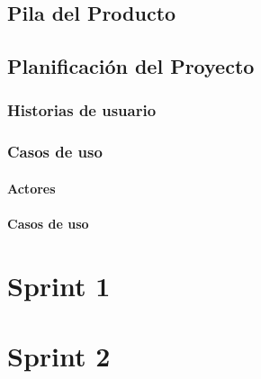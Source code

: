 \subsection{Pila del Producto}
\label{sec:PilaProducto}

\subsection{Planificación del Proyecto}
\label{sec:Planificacion}

\subsubsection{Historias de usuario}
\label{sec:HistoriasUsuario}

\subsubsection{Casos de uso}
\label{sec:CasosUso}

\paragraph{Actores}
\label{par:Actores}

\paragraph{Casos de uso}
\label{par:CasosdeUso}

\section{Sprint 1}
\label{sec:Sprint1}

\section{Sprint 2}
\label{sec:Sprint2}